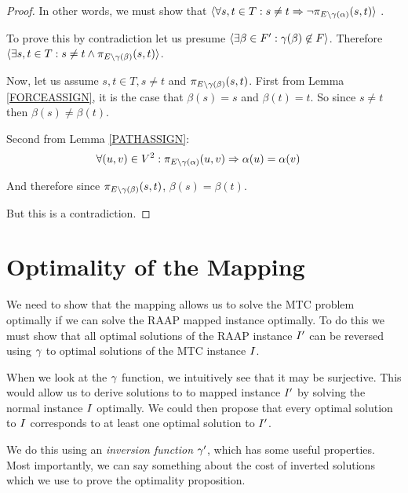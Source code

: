 \begin{proof}
In other words, we must show that $ \langle \forall s, t \in T : s \neq t \Rightarrow \neg\pi_{E \setminus \gamma(\alpha)}(s, t) \rangle$ .

To prove this by contradiction let us presume $\langle \exists \beta \in F' : \gamma(\beta) \not\in F \rangle$.
Therefore $\langle \exists s, t \in T : s \neq t \wedge \pi_{E \setminus \gamma(\beta)}(s, t) \rangle$.

Now, let us assume $s, t \in T, s \neq t$ and $\pi_{E \setminus \gamma(\beta)}(s, t)$.
First from Lemma \ref{FORCEASSIGN}, it is the case that $\beta(s) = s$ and $\beta(t) = t$.
So since $s \neq t$ then $\beta(s) \neq \beta(t)$.

Second from Lemma \ref{PATHASSIGN}:
\begin{align}
	\nonumber \forall (u, v) \in V^2 : \pi_{E \setminus \gamma(\alpha)}(u, v) & \Rightarrow \alpha(u) = \alpha(v)
\end{align}

And therefore since $\pi_{E \setminus \gamma(\beta)}(s, t)$, $\beta(s) = \beta(t)$.

But this is a contradiction.
\end{proof}

\section{Optimality of the Mapping}
\label{secHardOpt}

We need to show that the mapping allows us to solve the MTC problem optimally if we can solve the RAAP mapped instance optimally.
To do this we must show that all optimal solutions of the RAAP instance $I'$ can be reversed using $\gamma$ to optimal solutions of the MTC instance $I$.

When we look at the $\gamma$ function, we intuitively see that it may be surjective.
This would allow us to derive solutions to to mapped instance $I'$ by solving the normal instance $I$ optimally.
We could then propose that every optimal solution to $I$ corresponds to at least one optimal solution to $I'$.

We do this using an {\em inversion function} $\gamma'$, which has some useful properties.
Most importantly, we can say something about the cost of inverted solutions which we use to prove the optimality proposition.

